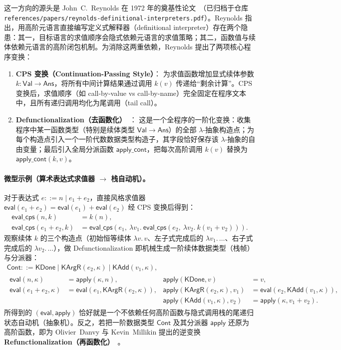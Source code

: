 \documentclass[UTF8,a4paper,11pt,fontset=fandol]{ctexart}
\newcommand{\code}[1]{\texttt{#1}}
\newcommand{\kw}[1]{\mathsf{#1}}
\begin{document}
这一方向的源头是 John~C.~Reynolds 在 1972 年的奠基性论文~\cite{reynolds1972}（已归档于仓库 \code{references/papers/reynolds-definitional-interpreters.pdf}）。Reynolds 指出，用高阶元语言直接编写定义式解释器（definitional interpreter）存在两个隐患：其一，目标语言的求值顺序会隐式依赖元语言的求值策略；其二，函数值与续体依赖元语言的高阶闭包机制。为消除这两重依赖，Reynolds 提出了两项核心程序变换：

\begin{enumerate}
\item \textbf{CPS 变换（Continuation-Passing Style）}：
  为求值函数增加显式续体参数 $k : \mathsf{Val} \to \mathsf{Ans}$，将所有中间计算结果通过调用 $k(v)$ 传递给“剩余计算”。CPS 变换后，求值顺序（如 call-by-value vs call-by-name）完全固定在程序文本中，且所有递归调用均化为尾调用（tail call）。

\item \textbf{Defunctionalization（去函数化）}~\cite{reynolds1972,danvy2001defunc}：
  这是一个全程序的一阶化变换：收集程序中某一函数类型（特别是续体类型 $\mathsf{Val} \to \mathsf{Ans}$）的全部 $\lambda$-抽象构造点；为每个构造点引入一个一阶代数数据类型构造子，其字段恰好保存该 $\lambda$-抽象的自由变量；最后引入全局分派函数 $\kw{apply\_cont}$，把每次高阶调用 $k(v)$ 替换为 $\kw{apply\_cont}(k, v)$。
\end{enumerate}

\paragraph{微型示例（算术表达式求值器 $\to$ 栈自动机）。}
对于表达式 $e ::= n \mid e_1 + e_2$，直接风格求值器 $\kw{eval}(e_1+e_2) = \kw{eval}(e_1) + \kw{eval}(e_2)$ 经 CPS 变换后得到：
\[
\begin{aligned}
\kw{eval\_cps}(n, k) &= k(n),\\
\kw{eval\_cps}(e_1 + e_2, k) &= \kw{eval\_cps}(e_1,\ \lambda v_1.\ \kw{eval\_cps}(e_2,\ \lambda v_2.\ k(v_1 + v_2))).
\end{aligned}
\]
观察续体 $k$ 的三个构造点（初始恒等续体 $\lambda v.\,v$、左子式完成后的 $\lambda v_1.\,\dots$、右子式完成后的 $\lambda v_2.\,\dots$），做 Defunctionalization 即机械生成一阶续体数据类型（栈帧）与分派器：
\[
\begin{gathered}
\mathsf{Cont} ::= \kw{KDone} \mid \kw{KArgR}(e_2, \kappa) \mid \kw{KAdd}(v_1, \kappa),\\
\begin{aligned}
\kw{eval}(n, \kappa) &= \kw{apply}(\kappa, n), &
\kw{apply}(\kw{KDone}, v) &= v,\\
\kw{eval}(e_1+e_2, \kappa) &= \kw{eval}(e_1, \kw{KArgR}(e_2, \kappa)), &
\kw{apply}(\kw{KArgR}(e_2, \kappa), v_1) &= \kw{eval}(e_2, \kw{KAdd}(v_1, \kappa)),\\
& & \kw{apply}(\kw{KAdd}(v_1, \kappa), v_2) &= \kw{apply}(\kappa, v_1 + v_2).
\end{aligned}
\end{gathered}
\]
所得到的 $(\kw{eval}, \kw{apply})$ 恰好就是一个不依赖任何高阶函数与隐式调用栈的尾递归状态自动机（抽象机）。反之，若把一阶数据类型 $\mathsf{Cont}$ 及其分派器 $\kw{apply}$ 还原为高阶函数，即为 Olivier~Danvy 与 Kevin~Millikin 提出的逆变换 \textbf{Refunctionalization（再函数化）}~\cite{danvy2009refunc}。
\end{document}
